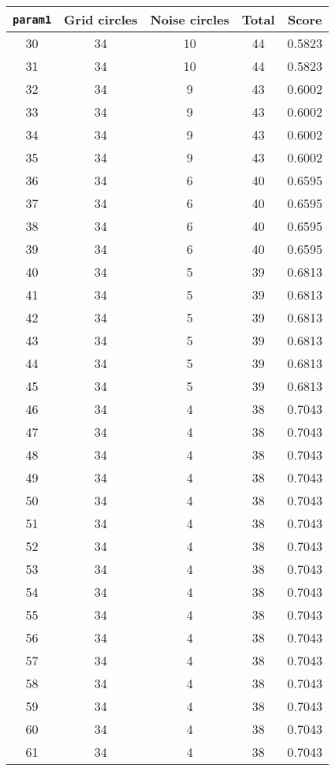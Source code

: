 \documentclass[letterpaper, 12pt]{article}
\begin{document}
\begin{longtable}{|c|c|c|c|c|}
\hline
\textbf{\texttt{param1}} & \textbf{Grid circles} & \textbf{Noise circles} & \textbf{Total} & \textbf{Score} \\
\hline
30 & 34 & 10 & 44 & 0.5823 \\
\hline
31 & 34 & 10 & 44 & 0.5823 \\
\hline
32 & 34 & 9 & 43 & 0.6002 \\
\hline
33 & 34 & 9 & 43 & 0.6002 \\
\hline
34 & 34 & 9 & 43 & 0.6002 \\
\hline
35 & 34 & 9 & 43 & 0.6002 \\
\hline
36 & 34 & 6 & 40 & 0.6595 \\
\hline
37 & 34 & 6 & 40 & 0.6595 \\
\hline
38 & 34 & 6 & 40 & 0.6595 \\
\hline
39 & 34 & 6 & 40 & 0.6595 \\
\hline
40 & 34 & 5 & 39 & 0.6813 \\
\hline
41 & 34 & 5 & 39 & 0.6813 \\
\hline
42 & 34 & 5 & 39 & 0.6813 \\
\hline
43 & 34 & 5 & 39 & 0.6813 \\
\hline
44 & 34 & 5 & 39 & 0.6813 \\
\hline
45 & 34 & 5 & 39 & 0.6813 \\
\hline
46 & 34 & 4 & 38 & 0.7043 \\
\hline
47 & 34 & 4 & 38 & 0.7043 \\
\hline
48 & 34 & 4 & 38 & 0.7043 \\
\hline
49 & 34 & 4 & 38 & 0.7043 \\
\hline
50 & 34 & 4 & 38 & 0.7043 \\
\hline
51 & 34 & 4 & 38 & 0.7043 \\
\hline
52 & 34 & 4 & 38 & 0.7043 \\
\hline
53 & 34 & 4 & 38 & 0.7043 \\
\hline
54 & 34 & 4 & 38 & 0.7043 \\
\hline
55 & 34 & 4 & 38 & 0.7043 \\
\hline
56 & 34 & 4 & 38 & 0.7043 \\
\hline
57 & 34 & 4 & 38 & 0.7043 \\
\hline
58 & 34 & 4 & 38 & 0.7043 \\
\hline
59 & 34 & 4 & 38 & 0.7043 \\
\hline
60 & 34 & 4 & 38 & 0.7043 \\
\hline
61 & 34 & 4 & 38 & 0.7043 \\

\end{longtable}
\end{document}
